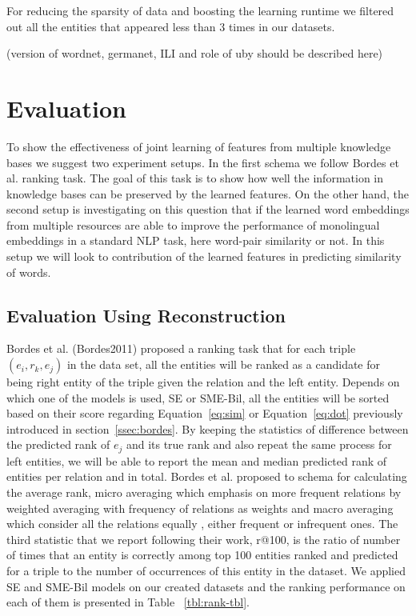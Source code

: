   For reducing the sparsity of data and boosting the learning runtime we 
  filtered out all the entities that appeared less than 3 times in our datasets.
   
  (version of wordnet, germanet, ILI and role of uby should be described here)  
 

\section{Evaluation}
\label{sec:ent-link-eval}

To show the effectiveness of joint learning of features from multiple knowledge bases we suggest 
two experiment setups. In the first schema we follow Bordes et al. ranking task. The goal of this task is
to show how well the information in knowledge bases can be preserved by the learned features. 
 On the other hand, the second
setup is investigating on this question that if the learned word embeddings from multiple resources
are able to improve the performance of monolingual embeddings in a standard NLP
task, here word-pair similarity or not.
In this setup we will look to contribution of the learned features in predicting similarity of words.

\subsection{Evaluation Using Reconstruction}
\label{ssec:ent-link-intrinsic}

Bordes et al. (Bordes2011) proposed a ranking task that for each triple $(e_{i} , r_{k}, e_{j} )$ in the data set,
 all the entities will be ranked as a candidate for being right entity of the triple 
 given the relation and the left entity. Depends on which one of the models is used, SE or SME-Bil, all the entities will be sorted
  based on their score regarding Equation~\eqref{eq:sim} or Equation~\ref{eq:dot} previously introduced in section~\ref{ssec:bordes}. 
  By keeping the statistics of difference between the predicted rank of $e_{j}$ and its true rank and also repeat the same process
  for left entities, we will be able to report the mean and median predicted rank of entities per relation and in total. Bordes et al.
   proposed to schema for calculating the average rank, micro averaging which emphasis on more frequent relations by
    weighted averaging with frequency of relations as weights and macro averaging which consider all the relations equally
    , either frequent or infrequent ones. The third statistic that we report following their work, r@100, is the ratio of number of times that 
    an entity is correctly among top 100 entities ranked and predicted for a triple to the number of occurrences of this entity in the dataset.
    We applied SE and SME-Bil models on our created datasets and the ranking performance on each of them is presented in Table ~\ref{tbl:rank-tbl}.
	
